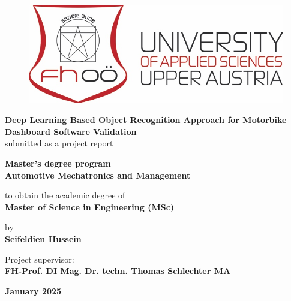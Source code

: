 \begin{titlepage}
    \begin{center}
        \vspace*{0.5cm}
        
        \begin{figure}
            \centering
            \includegraphics[width=0.75\linewidth]{Figures/FH_Logo.png}
        \end{figure}
        
        \Huge\textbf{Deep Learning Based Object Recognition Approach for Motorbike Dashboard Software Validation}\\
        
        \vspace{0.5cm}
        \large{submitted as a project report}\\
        
        \vfill
        
        \textbf{Master's degree program}\\
        \textbf{Automotive Mechatronics and Management}\\
        
        \vspace{0.5cm}
        
        to obtain the academic degree of\\
        \textbf{Master of Science in Engineering (MSc)}\\
        
        \vfill
        
        by\\
        \textbf{Seifeldien Hussein}\\
        
        \vfill
        
        Project supervisor:\\
        \textbf{FH-Prof. DI Mag. Dr. techn. Thomas Schlechter MA} \\ 
        
        \vspace{0.8cm}
        
         \textbf{January 2025}
        
    \end{center}
\end{titlepage}
